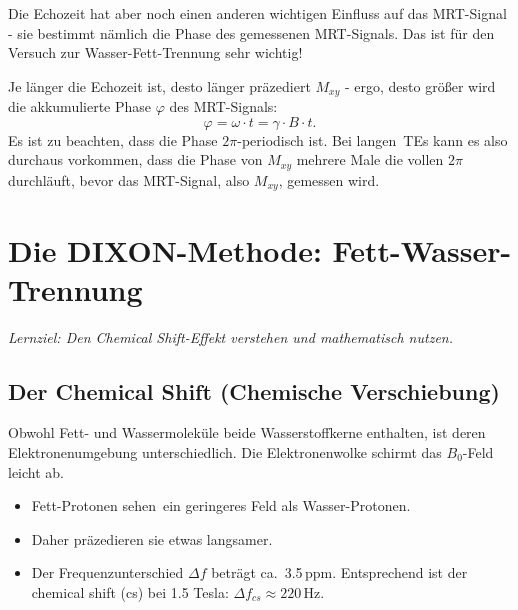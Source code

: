 \documentclass[a4paper,11pt]{article}
\newcommand{\lernziel}[1]{{\color{dunkel}\itshape Lernziel: #1\par}}
\newcommand{\Mxy}{M_{xy}}
\newcommand{\cs}{_{\mathit{cs}}}
\newcommand{\unit}[1]{\,\mathrm{#1}}
\begin{document}
Die Echozeit hat aber noch einen anderen wichtigen Einfluss auf das MRT-Signal - sie bestimmt nämlich die Phase des gemessenen MRT-Signals. Das ist für den Versuch zur Wasser-Fett-Trennung sehr wichtig!

Je länger die Echozeit ist, desto länger präzediert $\Mxy$ - ergo, desto größer wird die akkumulierte Phase $\varphi$ des MRT-Signals:
\[
\varphi = \omega \cdot t = \gamma \cdot B \cdot t.
\]
Es ist zu beachten, dass die Phase $2\pi$-periodisch ist. Bei \glqq langen\grqq\ TEs kann es also durchaus vorkommen, dass die Phase von $\Mxy$ mehrere Male die vollen $2\pi$ durchläuft, bevor das MRT-Signal, also $\Mxy$, gemessen wird.

\section{Die DIXON-Methode: Fett-Wasser-Trennung}\label{sec:dixon}
\lernziel{Den \glqq Chemical Shift\grqq-Effekt verstehen und mathematisch nutzen.}

\subsection{Der Chemical Shift (Chemische Verschiebung)}
Obwohl Fett- und Wassermoleküle beide Wasserstoffkerne enthalten, ist deren Elektronenumgebung unterschiedlich. Die Elektronenwolke schirmt das $B_0$-Feld leicht ab.
\begin{itemize}
\item Fett-Protonen \glqq sehen\grqq\ ein geringeres Feld als Wasser-Protonen.
\item Daher präzedieren sie etwas langsamer.
\item Der Frequenzunterschied $\Delta f$ beträgt ca.\ 3.5\,ppm. Entsprechend ist der chemical shift (cs) bei 1.5 Tesla: $\Delta f\cs \approx 220\unit{Hz}$.
\end{itemize}
\end{document}
